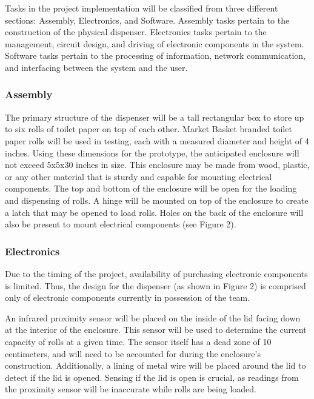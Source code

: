 \par Tasks in the project implementation will be classified from three different sections: Assembly, Electronics, and Software. Assembly tasks pertain to the construction of the physical dispenser. Electronics tasks pertain to the management, circuit design, and driving of electronic components in the system. Software tasks pertain to the processing of information, network communication, and interfacing between the system and the user.

\subsubsection{Assembly}
\par The primary structure of the dispenser will be a tall rectangular box to store up to six rolls of toilet paper on top of each other. Market Basket branded toilet paper rolls will be used in testing, each with a measured diameter and height of 4 inches. Using these dimensions for the prototype, the anticipated enclosure will not exceed 5x5x30 inches in size. This enclosure may be made from wood, plastic, or any other material that is sturdy and capable for mounting electrical components. The top and bottom of the enclosure will be open for the loading and dispensing of rolls. A hinge will be mounted on top of the enclosure to create a latch that may be opened to load rolls. Holes on the back of the enclosure will also be present to mount electrical components (see Figure 2).

\subsubsection{Electronics}
\par Due to the timing of the project, availability of purchasing electronic components is limited. Thus, the design for the dispenser (as shown in Figure 2) is comprised only of electronic components currently in possession of the team.

\par An infrared proximity sensor will be placed on the inside of the lid facing down at the interior of the enclosure. This sensor will be used to determine the current capacity of rolls at a given time. The sensor itself has a dead zone of 10 centimeters, and will need to be accounted for during the enclosure's construction. Additionally, a lining of metal wire will be placed around the lid to detect if the lid is opened. Sensing if the lid is open is crucial, as readings from the proximity sensor will be inaccurate while rolls are being loaded.

